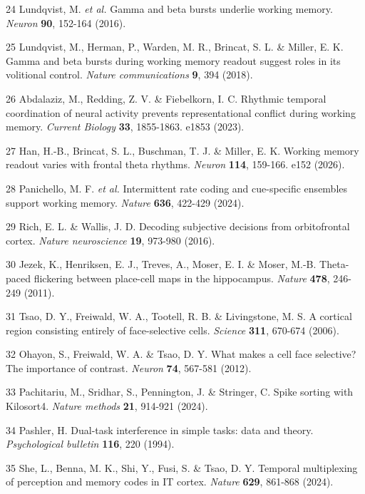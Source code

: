 \documentclass{article}
\begin{document}
\begin{hangpars}
24 Lundqvist, M. \textit{et al.} Gamma and beta bursts underlie working memory. \textit{Neuron} \textbf{90}, 152-164 (2016).

25 Lundqvist, M., Herman, P., Warden, M. R., Brincat, S. L. \& Miller, E. K. Gamma and beta bursts during working memory readout suggest roles in its volitional control. \textit{Nature communications} \textbf{9}, 394 (2018).

26 Abdalaziz, M., Redding, Z. V. \& Fiebelkorn, I. C. Rhythmic temporal coordination of neural activity prevents representational conflict during working memory. \textit{Current Biology} \textbf{33}, 1855-1863. e1853 (2023).

27 Han, H.-B., Brincat, S. L., Buschman, T. J. \& Miller, E. K. Working memory readout varies with frontal theta rhythms. \textit{Neuron} \textbf{114}, 159-166. e152 (2026).

28 Panichello, M. F. \textit{et al.} Intermittent rate coding and cue-specific ensembles support working memory. \textit{Nature} \textbf{636}, 422-429 (2024).

29 Rich, E. L. \& Wallis, J. D. Decoding subjective decisions from orbitofrontal cortex. \textit{Nature neuroscience} \textbf{19}, 973-980 (2016).

30 Jezek, K., Henriksen, E. J., Treves, A., Moser, E. I. \& Moser, M.-B. Theta-paced flickering between place-cell maps in the hippocampus. \textit{Nature} \textbf{478}, 246-249 (2011).

31 Tsao, D. Y., Freiwald, W. A., Tootell, R. B. \& Livingstone, M. S. A cortical region consisting entirely of face-selective cells. \textit{Science} \textbf{311}, 670-674 (2006).

32 Ohayon, S., Freiwald, W. A. \& Tsao, D. Y. What makes a cell face selective? The importance of contrast. \textit{Neuron} \textbf{74}, 567-581 (2012).

33 Pachitariu, M., Sridhar, S., Pennington, J. \& Stringer, C. Spike sorting with Kilosort4. \textit{Nature methods} \textbf{21}, 914-921 (2024).

34 Pashler, H. Dual-task interference in simple tasks: data and theory. \textit{Psychological bulletin} \textbf{116}, 220 (1994).

35 She, L., Benna, M. K., Shi, Y., Fusi, S. \& Tsao, D. Y. Temporal multiplexing of perception and memory codes in IT cortex. \textit{Nature} \textbf{629}, 861-868 (2024).
\end{hangpars}


\end{document}
